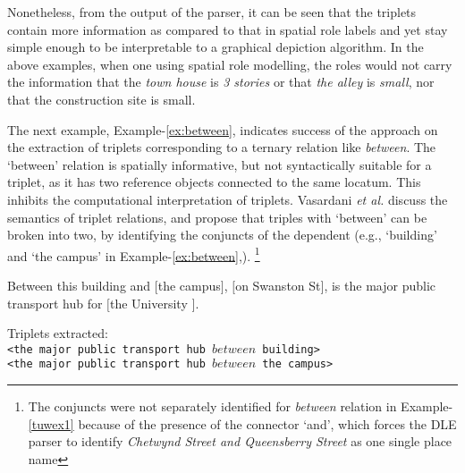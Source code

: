 \documentclass{sig-alternate}
\begin{document}
Nonetheless, from the output of the parser, it can be seen that the triplets contain more information as compared to that in spatial role labels and yet stay simple enough to be interpretable to a graphical depiction algorithm. In the above examples, when one using spatial role modelling, the roles would not carry the information that the \textit{town house} is \textit{3 stories} or that \textit{the alley} is \textit{small}, nor that the construction site is small.

The next example, Example-\ref{ex:between}, indicates success of the approach on the extraction of triplets corresponding to a ternary relation like \textit{between}. 
The `between' relation is spatially informative, but not syntactically suitable for a triplet, as it has two reference objects connected to the same locatum. 
This inhibits the computational interpretation of triplets. Vasardani \textit{et al.} \cite{maria:descriptions} discuss the semantics of triplet relations, and propose that triples with `between' can be broken into two, by identifying the conjuncts of the dependent (e.g., `building' and `the campus' in Example-\ref{ex:between},).
\footnote{The conjuncts were not separately identified for \textit{between} relation in Example-\ref{tuwex1} because of the presence of the connector `and', which forces the DLE parser to identify \textit{Chetwynd Street and Queensberry Street} as one single place name}
\begin{example}
\label{ex:between}
Between this building and $[$the campus$]$, $[$on Swanston St$]$, is the major public transport hub for $[$the University $]$. 
\end{example}
Triplets extracted:\\
\texttt{<the major public transport hub $between$  building>} \\
\texttt{<the major public transport hub $between$  the campus>} \\
\end{document}
